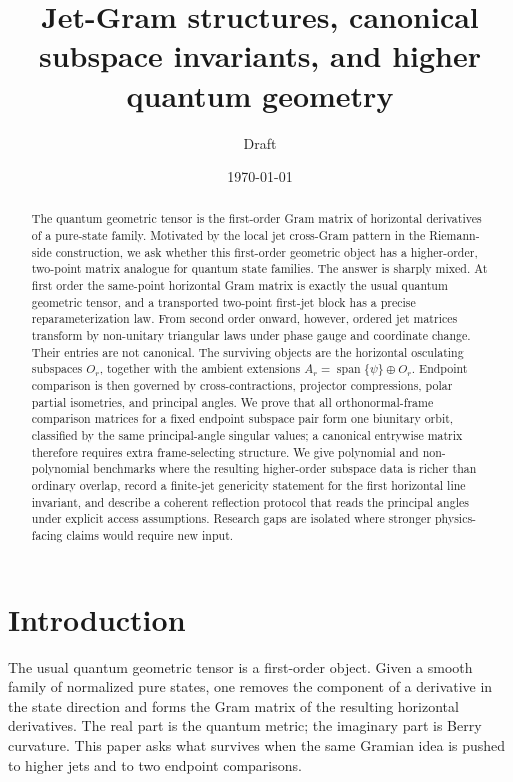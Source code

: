 \documentclass[11pt]{amsart}
\title[Jet-Gram structures and higher quantum geometry]{Jet-Gram structures,
canonical subspace invariants, and higher quantum geometry}
\author{Draft}
\date{\today}
\newcommand{\Span}{\operatorname{span}}
\begin{document}
\begin{abstract}
The quantum geometric tensor is the first-order Gram matrix of horizontal
derivatives of a pure-state family. Motivated by the local jet cross-Gram
pattern in the Riemann-side construction, we ask whether this first-order
geometric object has a higher-order, two-point matrix analogue for quantum
state families. The answer is sharply mixed. At first order the same-point
horizontal Gram matrix is exactly the usual quantum geometric tensor, and a
transported two-point first-jet block has a precise reparameterization law. From
second order onward, however, ordered jet matrices transform by non-unitary
triangular laws under phase gauge and coordinate change. Their entries are not
canonical. The surviving objects are the horizontal osculating subspaces
\(O_r\), together with the ambient extensions
\(A_r=\Span\{\psi\}\oplus O_r\). Endpoint comparison is then governed by
cross-contractions, projector compressions, polar partial isometries, and
principal angles. We prove that all orthonormal-frame comparison matrices for a
fixed endpoint subspace pair form one biunitary orbit, classified by the same
principal-angle singular values; a canonical entrywise matrix therefore
requires extra frame-selecting structure. We give polynomial and non-polynomial
benchmarks where the resulting higher-order subspace data is richer than
ordinary overlap, record a finite-jet genericity statement for the first
horizontal line invariant, and describe a coherent reflection protocol that
reads the principal angles under explicit access assumptions. Research gaps are
isolated where stronger physics-facing claims would require new input.
\end{abstract}

\maketitle

\tableofcontents

\section{Introduction}

The usual quantum geometric tensor is a first-order object. Given a smooth
family of normalized pure states, one removes the component of a derivative in
the state direction and forms the Gram matrix of the resulting horizontal
derivatives. The real part is the quantum metric; the imaginary part is Berry
curvature. This paper asks what survives when the same Gramian idea is pushed
to higher jets and to two endpoint comparisons.
\end{document}
